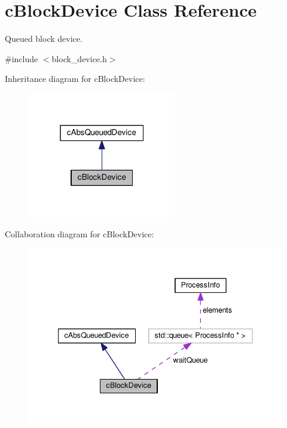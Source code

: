 \hypertarget{classcBlockDevice}{\section{c\-Block\-Device \-Class \-Reference}
\label{dd/d36/classcBlockDevice}
}


\-Queued block device.  




{\ttfamily \#include $<$block\-\_\-device.\-h$>$}



\-Inheritance diagram for c\-Block\-Device\-:\nopagebreak
\begin{figure}[H]
\begin{center}
\leavevmode
\includegraphics[width=184pt]{d2/d52/classcBlockDevice__inherit__graph}
\end{center}
\end{figure}


\-Collaboration diagram for c\-Block\-Device\-:\nopagebreak
\begin{figure}[H]
\begin{center}
\leavevmode
\includegraphics[width=342pt]{d1/dd3/classcBlockDevice__coll__graph}
\end{center}
\end{figure}
